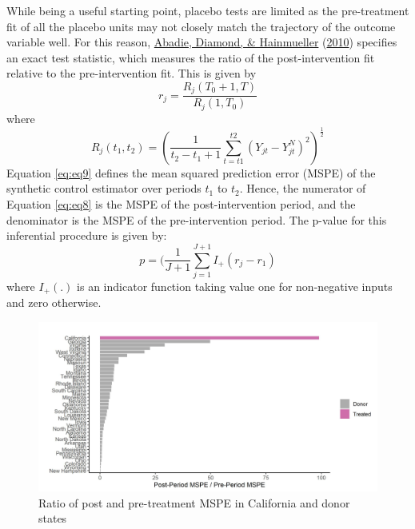 \documentclass[12pt,nobind, a4paper]{reedthesis}
\begin{document}
 While being a useful starting point, placebo tests are limited as the pre-treatment fit of all the placebo units may not closely match the trajectory of the outcome variable well. For this reason, \protect\hyperlink{ref-abadie_synthetic_2010}{Abadie, Diamond, \& Hainmueller} (\protect\hyperlink{ref-abadie_synthetic_2010}{2010}) specifies an exact test statistic, which measures the ratio of the post-intervention fit relative to the pre-intervention fit. This is given by
 \begin{equation}
 r_{j}= \frac{R_{j}(T_{0}+1,T)}{R_{j}(1,T_{0})}
 \label{eq:eq8}
 \end{equation}
 where
 \begin{equation}
 R_{j}(t_{1},t_{2})= (\frac{1}{t_{2}-t_{1}+1} \sum_{t=t1}^{t2}(Y_{jt}-Y_{jt}^{N})^2)^{\frac{1}{2}}
 \label{eq:eq9}
 \end{equation}
 Equation \eqref{eq:eq9} defines the mean squared prediction error (MSPE) of the synthetic control estimator over periods \(t_{1}\) to \(t_{2}\). Hence, the numerator of Equation \eqref{eq:eq8} is the MSPE of the post-intervention period, and the denominator is the MSPE of the pre-intervention period. The p-value for this inferential procedure is given by:
 \begin{equation}
 p= (\frac{1}{J+1} \sum_{j=1}^{J+1}I_{+}(r_{j}-r_{1})
 \label{eq:eq10}
 \end{equation}
 where \(I_{+}(.)\) is an indicator function taking value one for non-negative inputs and zero otherwise.
 \begin{figure}

 {\centering \includegraphics[width=1\linewidth]{figure/calmspe} 

 }

 \caption{Ratio of post and pre-treatment MSPE in California and donor states}\label{fig:mspe}
 \end{figure}
\end{document}
